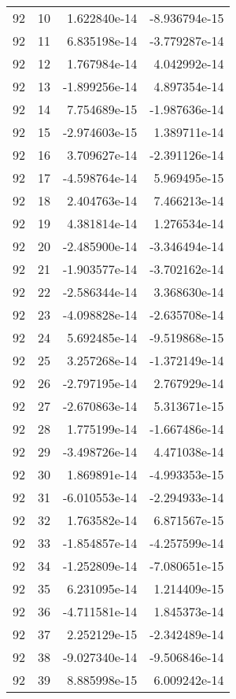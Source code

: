 \begin{tabular}{rrrr}
  92 &   10 &  1.622840e-14 & -8.936794e-15 \\
  92 &   11 &  6.835198e-14 & -3.779287e-14 \\
  92 &   12 &  1.767984e-14 &  4.042992e-14 \\
  92 &   13 & -1.899256e-14 &  4.897354e-14 \\
  92 &   14 &  7.754689e-15 & -1.987636e-14 \\
  92 &   15 & -2.974603e-15 &  1.389711e-14 \\
  92 &   16 &  3.709627e-14 & -2.391126e-14 \\
  92 &   17 & -4.598764e-14 &  5.969495e-15 \\
  92 &   18 &  2.404763e-14 &  7.466213e-14 \\
  92 &   19 &  4.381814e-14 &  1.276534e-14 \\
  92 &   20 & -2.485900e-14 & -3.346494e-14 \\
  92 &   21 & -1.903577e-14 & -3.702162e-14 \\
  92 &   22 & -2.586344e-14 &  3.368630e-14 \\
  92 &   23 & -4.098828e-14 & -2.635708e-14 \\
  92 &   24 &  5.692485e-14 & -9.519868e-15 \\
  92 &   25 &  3.257268e-14 & -1.372149e-14 \\
  92 &   26 & -2.797195e-14 &  2.767929e-14 \\
  92 &   27 & -2.670863e-14 &  5.313671e-15 \\
  92 &   28 &  1.775199e-14 & -1.667486e-14 \\
  92 &   29 & -3.498726e-14 &  4.471038e-14 \\
  92 &   30 &  1.869891e-14 & -4.993353e-15 \\
  92 &   31 & -6.010553e-14 & -2.294933e-14 \\
  92 &   32 &  1.763582e-14 &  6.871567e-15 \\
  92 &   33 & -1.854857e-14 & -4.257599e-14 \\
  92 &   34 & -1.252809e-14 & -7.080651e-15 \\
  92 &   35 &  6.231095e-14 &  1.214409e-15 \\
  92 &   36 & -4.711581e-14 &  1.845373e-14 \\
  92 &   37 &  2.252129e-15 & -2.342489e-14 \\
  92 &   38 & -9.027340e-14 & -9.506846e-14 \\
  92 &   39 &  8.885998e-15 &  6.009242e-14 \\

\end{tabular}
